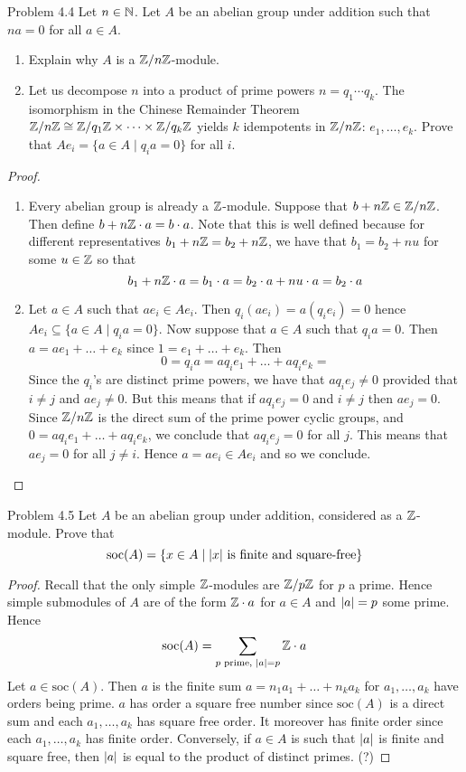 \documentclass[a4paper]{article}
\begin{document}
\begin{ex}{Problem 4.4}{} Let $n\in\mathbb{N}$. Let $A$ be an abelian group under addition such that $na=0$ for all $a\in A$. 
\begin{enumerate}
\item Explain why $A$ is a $\mathbb{Z}/n\mathbb{Z}$-module. 
\item Let us decompose $n$ into a product of prime powers $n=q_1\cdots q_k$. The isomorphism in the Chinese Remainder Theorem $\mathbb{Z}/n\mathbb{Z}\cong\mathbb{Z}/q_1\mathbb{Z}\times\cdots\times\mathbb{Z}/q_k\mathbb{Z}$ yields $k$ idempotents in $\mathbb{Z}/n\mathbb{Z}$: $e_1,\dots,e_k$. Prove that $Ae_i=\{a\in A\;|\;q_ia=0\}$ for all $i$. 
\end{enumerate} \tcbline
\begin{proof}~\\
\begin{enumerate}
\item Every abelian group is already a $\mathbb{Z}$-module. Suppose that $b+n\mathbb{Z}\in\mathbb{Z}/n\mathbb{Z}$. Then define $b+n\mathbb{Z}\cdot a=b\cdot a$. Note that this is well defined because for different representatives $b_1+n\mathbb{Z}=b_2+n\mathbb{Z}$, we have that $b_1=b_2+nu$ for some $u\in\mathbb{Z}$ so that $$b_1+n\mathbb{Z}\cdot a=b_1\cdot a=b_2\cdot a+nu\cdot a=b_2\cdot a$$
\item Let $a\in A$ such that $ae_i\in Ae_i$. Then $q_i(ae_i)=a(q_ie_i)=0$ hence $Ae_i\subseteq\{a\in A\;|\;q_ia=0\}$. Now suppose that $a\in A$ such that $q_ia=0$. Then $a=ae_1+\dots+e_k$ since $1=e_1+\dots+e_k$. Then $$0=q_ia=aq_ie_1+\dots+aq_ie_k=$$ Since the $q_i$'s are distinct prime powers, we have that $aq_ie_j\neq 0$ provided that $i\neq j$ and $ae_j\neq 0$. But this means that if $aq_ie_j=0$ and $i\neq j$ then $ae_j=0$. Since $\mathbb{Z}/n\mathbb{Z}$ is the direct sum of the prime power cyclic groups, and $0=aq_ie_1+\dots+aq_ie_k$, we conclude that $aq_ie_j=0$ for all $j$. This means that $ae_j=0$ for all $j\neq i$. Hence $a=ae_i\in Ae_i$ and so we conclude. 
\end{enumerate}
\end{proof}
\end{ex}

\begin{ex}{Problem 4.5}{} Let $A$ be an abelian group under addition, considered as a $\mathbb{Z}$-module. Prove that $$\text{soc}(A)=\{x\in A\;|\;\abs{x}\text{ is finite and square-free}\}$$ \tcbline
\begin{proof}
Recall that the only simple $\mathbb{Z}$-modules are $\mathbb{Z}/p\mathbb{Z}$ for $p$ a prime. Hence simple submodules of $A$ are of the form $\mathbb{Z}\cdot a$ for $a\in A$ and $\abs{a}=p$ some prime. Hence $$\text{soc}(A)=\sum_{p\text{ prime, }\abs{a}=p}\mathbb{Z}\cdot a$$ Let $a\in\text{soc}(A)$. Then $a$ is the finite sum $a=n_1a_1+\dots+n_ka_k$ for $a_1,\dots,a_k$ have orders being prime. $a$ has order a square free number since $\text{soc}(A)$ is a direct sum and each $a_1,\dots,a_k$ has square free order. It moreover has finite order since each $a_1,\dots,a_k$ has finite order. Conversely, if $a\in A$ is such that $\abs{a}$ is finite and square free, then $\abs{a}$ is equal to the product of distinct primes. (?)
\end{proof}
\end{ex}
\end{document}
